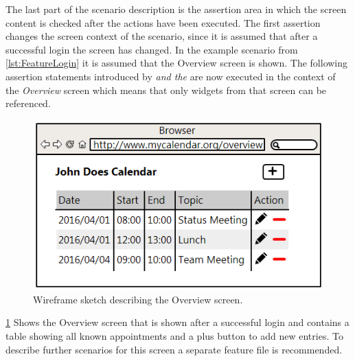\documentclass{sig-alternate-05-2015}
\begin{document}
The last part of the scenario description is the assertion area in which the screen content is checked after the actions have been executed.
The first assertion changes the screen context of the scenario, since it is assumed that after a successful login the screen has changed.
In the example scenario from \cref{lst:FeatureLogin} it is assumed that the Overview screen is shown.
The following assertion statements introduced by \textit{and the} are now executed in the context of the \textit{Overview} screen which means that only widgets from that screen can be referenced.
\begin{figure}[h]
	\centering
	\includegraphics[width=0.8\linewidth]{Overview.png}
	\caption{Wireframe sketch describing the Overview screen.}
	\label{fig:overview}
\end{figure}
\cref{fig:overview} Shows the Overview screen that is shown after a successful login and contains a table showing all known appointments and a plus button to add new entries.
To describe further scenarios for this screen a separate feature file is recommended.
\end{document}
